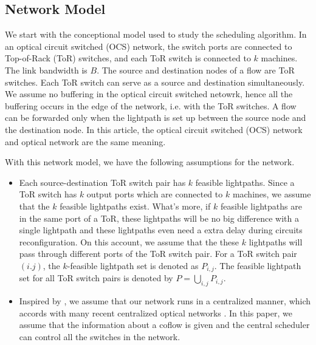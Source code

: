 \subsection{Network Model}\label{sec:networkmodel}
We start with the conceptional model used to study the scheduling algorithm. In an optical circuit switched (OCS) network, the switch ports are connected to Top-of-Rack (ToR) switches, and each ToR switch is connected to $k$ machines. The link bandwidth is $B$. The source and destination nodes of a flow are ToR switches. Each ToR switch can serve as a source and destination simultaneously. We assume no buffering in the optical circuit switched netowrk, hence all the buffering occurs in the edge of the network, i.e. with the ToR switches. A flow can be forwarded only when the lightpath is set up between the source node and the destination node. In this article, the optical circuit switched (OCS) network and optical network are the same meaning.

With this network model, we have the following assumptions for the network.

\begin{itemize}
\item Each source-destination ToR switch pair has $k$ feasible lightpaths. Since a ToR switch has $k$ output ports which are connected to $k$ machines, we assume that the $k$ feasible lightpaths exist. What's more, if $k$ feasible lightpaths are in the same port of a ToR, these lightpaths will be no big difference with a single lightpath and these lightpaths even need a extra delay during circuits reconfiguration. On this account, we assume that the these $k$ lightpaths will pass through different ports of the ToR switch pair. For a ToR switch pair $(i.j)$, the $k$-feasible lightpath set is denoted as $P_{i,j}$. The feasible lightpath set for all ToR switch pairs is denoted by $P=\bigcup_{i,j}P_{i,j}$.  
\item Inspired by \cite{chowdhury2011managing} \cite{chowdhury2014efficient}, we assume that our network runs in a centralized manner, which accords with many recent centralized optical networks \cite{simeonidou2013software} \cite{ramamurthy2002fixed}. In this paper, we assume that the information about a coflow is given and the central scheduler can control all the switches in the network. 
\end{itemize}

